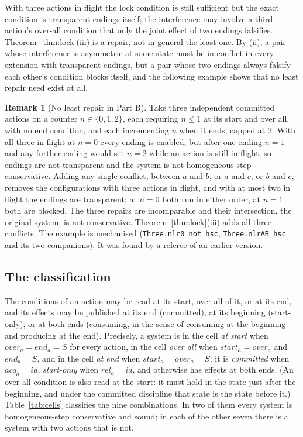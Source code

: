 \documentclass[preprint,12pt]{elsarticle}
\theoremstyle{plain}
\theoremstyle{definition}
\newtheorem{remark}[theorem]{Remark}
\newcommand{\st}{\mathit{start}}
\newcommand{\ovr}{\mathit{over}}
\newcommand{\stp}{\mathit{end}}
\newcommand{\acq}{\mathit{acq}}
\newcommand{\rel}{\mathit{rel}}
\newcommand{\id}{\mathit{id}}
\newcommand{\lean}[1]{\texttt{#1}}
\begin{document}
With three actions in flight the lock condition is still sufficient but the exact condition is transparent endings itself; the interference may involve a third action's over-all condition that only the joint effect of two endings falsifies. Theorem~\ref{thm:lock}(iii) is a repair, not in general the least one. By (ii), a pair whose interference is asymmetric at some state must be in conflict in every extension with transparent endings, but a pair whose two endings always falsify each other's condition blocks itself, and the following example shows that no least repair need exist at all.

\begin{remark}[No least repair in Part B]
\label{rem:noleast}
Take three independent committed actions on a counter $n \in \{0, 1, 2\}$, each requiring $n \le 1$ at its start and over all, with no end condition, and each incrementing $n$ when it ends, capped at $2$. With all three in flight at $n = 0$ every ending is enabled, but after one ending $n = 1$ and any further ending would set $n = 2$ while an action is still in flight; so endings are not transparent and the system is not homogeneous-step conservative. Adding any single conflict, between $a$ and $b$, or $a$ and $c$, or $b$ and $c$, removes the configurations with three actions in flight, and with at most two in flight the endings are transparent: at $n = 0$ both run in either order, at $n = 1$ both are blocked. The three repairs are incomparable and their intersection, the original system, is not conservative. Theorem~\ref{thm:lock}(iii) adds all three conflicts. The example is mechanised (\lean{Three.nlr0\_not\_hsc}, \lean{Three.nlrAB\_hsc} and its two companions). It was found by a referee of an earlier version.
\end{remark}

\subsection{The classification}
\label{sec:cells}

The conditions of an action may be read at its start, over all of it, or at its end, and its effects may be published at its end (committed), at its beginning (start-only), or at both ends (consuming, in the sense of consuming at the beginning and producing at the end). Precisely, a system is in the cell \emph{at start} when $\ovr_a = \stp_a = S$ for every action, in the cell \emph{over all} when $\st_a = \ovr_a$ and $\stp_a = S$, and in the cell \emph{at end} when $\st_a = \ovr_a = S$; it is \emph{committed} when $\acq_a = \id$, \emph{start-only} when $\rel_a = \id$, and otherwise has effects at both ends. (An over-all condition is also read at the start: it must hold in the state just after the beginning, and under the committed discipline that state is the state before it.) Table~\ref{tab:cells} classifies the nine combinations. In two of them every system is homogeneous-step conservative and sound; in each of the other seven there is a system with two actions that is not.
\end{document}
